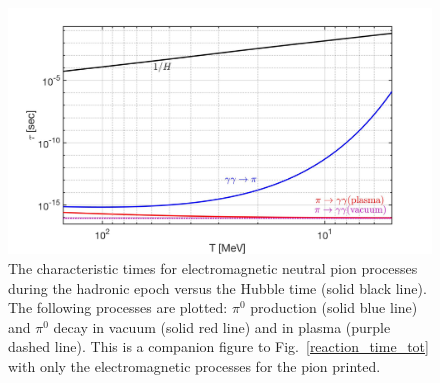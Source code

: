 \documentclass[universe,article,submit,moreauthors,pdftex,a4paper]{Definitions/mdpi}
\newcommand*{\rf}[1]{Fig.~{\ref{#1}}}
\begin{document}
\begin{figure}[ht]
\begin{center}
\centering
\includegraphics[width=\linewidth]{./plots/PionRateHubble.jpg}
\caption{The characteristic times for electromagnetic neutral pion processes during the hadronic epoch versus the Hubble time (solid black line). The following processes are plotted: $\pi^{0}$ production (solid blue line) and $\pi^{0}$ decay in vacuum (solid red line) and in plasma (purple dashed line). This is a companion figure to \rf{reaction_time_tot} with only the electromagnetic processes for the pion printed.}
\label{PionRateHubble}
\end{center}
\end{figure}
\end{document}
